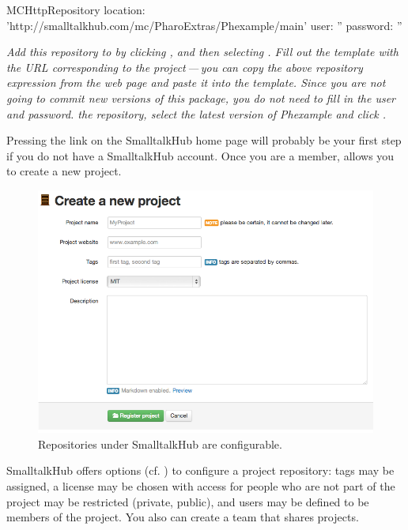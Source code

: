\documentclass[a4paper,10pt,twoside]{book}
\begin{document}
\begin{code}{}
MCHttpRepository
    location: 'http://smalltalkhub.com/mc/PharoExtras/Phexample/main'
    user: ''
    password: ''
\end{code}
\noindent
\emph{Add this repository to \Mont by clicking ,
  and then selecting . Fill out the template with the URL
  corresponding to the project\,---\,you can copy the above
  repository expression from the web page and paste it into the
  template. Since you are not going to commit new versions of this
  package, you do not need to fill in the user and password.
   the repository, select the latest version of Phexample and click
  .}

Pressing the  link on the SmalltalkHub home page will probably be your first step if you do not have a SmalltalkHub account. 
Once you are a member,  allows you to create a new project. 


\begin{figure}[ht]\centering
	\includegraphics[width=\textwidth]{squeaksourcesetting}
	\caption{Repositories under SmalltalkHub are configurable.}
\end{figure}

SmalltalkHub offers options (cf. ) to configure a project repository: tags may be assigned, a license may be chosen with access for people who are not part of the project may be restricted (private, public), and users may be defined to be members of the project. You also can create a team that shares projects.
\end{document}
